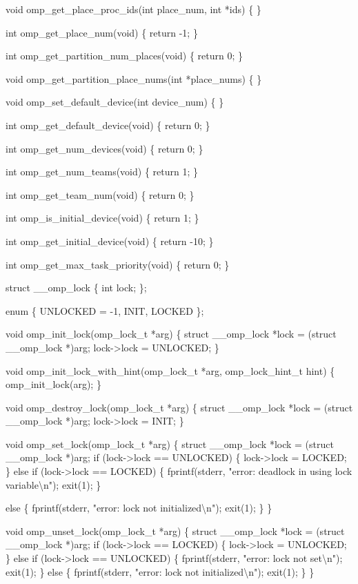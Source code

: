 {\begin{codepar}
void omp\_get\_place\_proc\_ids(int place\_num, int *ids)
\{
\}

int omp\_get\_place\_num(void)
\{
    return -1;
\}

int omp\_get\_partition\_num\_places(void)
\{
    return 0;
\}

void omp\_get\_partition\_place\_nums(int *place\_nums)
\{
\}

void omp\_set\_default\_device(int device\_num)
\{
\}

int omp\_get\_default\_device(void)
\{
    return 0;
\}

int omp\_get\_num\_devices(void)
\{
    return 0;
\}

int omp\_get\_num\_teams(void)
\{
    return 1;
\}

int omp\_get\_team\_num(void)
\{
    return 0;
\}

int omp\_is\_initial\_device(void)
\{
    return 1;
\}

int omp\_get\_initial\_device(void)
\{
    return -10;
\}

int omp\_get\_max\_task\_priority(void)
\{
    return 0;
\}

struct \_\_omp\_lock
\{
    int lock;
\};

enum \{ UNLOCKED = -1, INIT, LOCKED \};

void omp\_init\_lock(omp\_lock\_t *arg)
\{
    struct \_\_omp\_lock *lock = (struct \_\_omp\_lock *)arg;
    lock->lock = UNLOCKED;
\}

void omp\_init\_lock\_with\_hint(omp\_lock\_t *arg, omp\_lock\_hint\_t hint)
\{
    omp\_init\_lock(arg);
\}

void omp\_destroy\_lock(omp\_lock\_t *arg)
\{
    struct \_\_omp\_lock *lock = (struct \_\_omp\_lock *)arg;
    lock->lock = INIT;
\}

void omp\_set\_lock(omp\_lock\_t *arg)
\{
    struct \_\_omp\_lock *lock = (struct \_\_omp\_lock *)arg;
    if (lock->lock == UNLOCKED)
    \{
        lock->lock = LOCKED;
    \}
    else if (lock->lock == LOCKED)
    \{
        fprintf(stderr, "error: deadlock in using lock variable{\textbackslash}n");
        exit(1);
    \}

    else
    \{
        fprintf(stderr, "error: lock not initialized{\textbackslash}n");
        exit(1);
    \}
\}

void omp\_unset\_lock(omp\_lock\_t *arg)
\{
    struct \_\_omp\_lock *lock = (struct \_\_omp\_lock *)arg;
    if (lock->lock == LOCKED)
    \{
        lock->lock = UNLOCKED;
    \}
    else if (lock->lock == UNLOCKED)
    \{
        fprintf(stderr, "error: lock not set{\textbackslash}n");
        exit(1);
    \}
    else
    \{
        fprintf(stderr, "error: lock not initialized{\textbackslash}n");
        exit(1);
    \}
\}


\end{codepar}}
